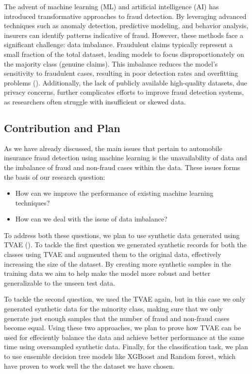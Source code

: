 \documentclass[twoside,11pt]{article}
\begin{document}
The advent of machine learning (ML) and artificial intelligence (AI) has introduced transformative approaches to fraud detection. By leveraging advanced techniques such as anomaly detection, predictive modeling, and behavior analysis, insurers can identify patterns indicative of fraud. However, these methods face a significant challenge: data imbalance. Fraudulent claims typically represent a small fraction of the total dataset, leading models to focus disproportionately on the majority class (genuine claims). This imbalance reduces the model's sensitivity to fraudulent cases, resulting in poor detection rates and overfitting problems (\citealp{phuaComprehensiveSurveyData2012}). Additionally, the lack of publicly available high-quality datasets, due privacy concerns, further complicates efforts to improve fraud detection systems, as researchers often struggle with insufficient or skewed data.

\subsection{Contribution and Plan}

As we have already discussed, the main issues that pertain to automobile insurance fraud detection using machine learning is the unavailability of data and the imbalance of fraud and non-fraud cases within the data. These issues forms the basis of our research question:

\begin{itemize}
    \item How can we improve the performance of existing machine learning techniques?
    \item How can we deal with the issue of data imbalance?
\end{itemize}

To address both these questions, we plan to use synthetic data generated using TVAE (\citealp{XuRp}). To tackle the first question we generated synthetic records for both the classes using TVAE and augmented them to the original data, effectively increasing the size of the dataset. By creating more synthetic samples in the training data we aim to help make the model more robust and better generalizable to the unseen test data.

To tackle the second question, we used the TVAE again, but in this case we only generated synthetic data for the minority class, making sure that we only generate just enough samples that the number of fraud and non-fraud cases become equal. Using these two approaches, we plan to prove how TVAE can be used for effeciently balance the data and achieve better performance at the same time using oversampled synthetic data. Finally, for the classification task, we plan to use ensemble decision tree models like XGBoost and Random forest, which have proven to work well the the dataset we have chosen.
\end{document}
